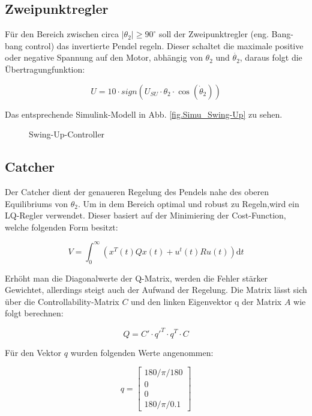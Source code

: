 \subsection{Zweipunktregler}
\label{zweipunktregler} 

Für den Bereich zwischen circa $\left| \theta_2 \right| \geq 90^\circ$ soll der Zweipunktregler (eng. Bang-bang control) das invertierte Pendel regeln. Dieser schaltet die maximale positive oder negative Spannung auf den Motor, abhängig von $ \theta_2 $ und $ \dot{\theta_2} $, daraus folgt die Übertragungfunktion:

\begin{equation}
U = 10 \cdot sign(U_{SU} \cdot \theta_2 \cdot \cos(\dot{\theta}_2))
\end{equation}

Das entsprechende Simulink-Modell in Abb. \ref{fig.Simu_Swing-Up}
zu sehen. 

\begin{figure}[h!]
  \caption{Swing-Up-Controller}
  \centering
\end{figure}

\subsection{Catcher}
\label{catcher} 

Der Catcher dient der genaueren Regelung des Pendels nahe des oberen Equilibriums von $ \theta_2 $. Um in dem Bereich optimal und robust zu Regeln,wird ein LQ-Regler verwendet. Dieser basiert auf der Minimiering der Cost-Function, welche folgenden Form besitzt:

\begin{equation}
 V = \int_0^\infty \! (x^T(t) Qx(t) + u^t(t) R u(t))  \mathrm{d}t
\end{equation}

Erhöht man die Diagonalwerte der Q-Matrix, werden die Fehler stärker Gewichtet, allerdings steigt auch der Aufwand der Regelung. Die Matrix lässt sich über die Controllability-Matrix $C$ und den linken Eigenvektor q der Matrix $A$
wie folgt berechnen:

\begin{equation}
 Q = C' \cdot q'^T \cdot q^T \cdot C
\end{equation}

Für den Vektor $q$ wurden folgenden Werte angenommen:

\begin{equation}
q =\begin{bmatrix}
         180/\pi/180 \\
         0\\
         0\\
         180/\pi/0.1
        \end{bmatrix}
\end{equation}
 
